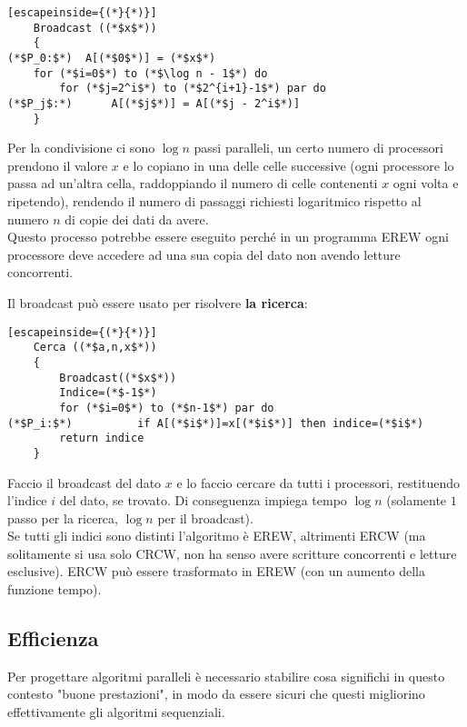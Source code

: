 \begin{lstlisting}[escapeinside={(*}{*)}]
	Broadcast ((*$x$*))
	{
(*$P_0:$*)	A[(*$0$*)] = (*$x$*)
	for (*$i=0$*) to (*$\log n - 1$*) do
		for (*$j=2^i$*) to (*$2^{i+1}-1$*) par do
(*$P_j$:*)		A[(*$j$*)] = A[(*$j - 2^i$*)]
	}
\end{lstlisting}

Per la condivisione ci sono $\log n$ passi paralleli, un certo numero di processori prendono il valore $x$ e lo copiano in una delle celle successive (ogni processore lo passa ad un'altra cella, raddoppiando il numero di celle contenenti $x$ ogni volta e ripetendo), rendendo il numero di passaggi richiesti logaritmico rispetto al numero $n$ di copie dei dati da avere.\\

Questo processo potrebbe essere eseguito perché in un programma EREW ogni processore deve accedere ad una sua copia del dato non avendo letture concorrenti. \\

\newpage

Il broadcast può essere usato per risolvere \textbf{la ricerca}:
\begin{lstlisting}[escapeinside={(*}{*)}]
	Cerca ((*$a,n,x$*))
	{
		Broadcast((*$x$*))
		Indice=(*$-1$*)
		for (*$i=0$*) to (*$n-1$*) par do
(*$P_i:$*)			if A[(*$i$*)]=x[(*$i$*)] then indice=(*$i$*)
		return indice
	}
\end{lstlisting}

Faccio il broadcast del dato $x$ e lo faccio cercare da tutti i processori, restituendo l'indice $i$ del dato, se trovato. Di conseguenza impiega tempo $\log n$ (solamente $1$ passo per la ricerca, $\log n$ per il broadcast).\\

Se tutti gli indici sono distinti l'algoritmo è EREW, altrimenti ERCW (ma solitamente si usa solo CRCW, non ha senso avere scritture concorrenti e letture esclusive). ERCW può essere trasformato in EREW (con un aumento della funzione tempo).\\

\newpage

\subsection{Efficienza}
Per progettare algoritmi paralleli è necessario stabilire cosa significhi in questo contesto "buone prestazioni", in modo da essere sicuri che questi migliorino effettivamente gli algoritmi sequenziali. \\

